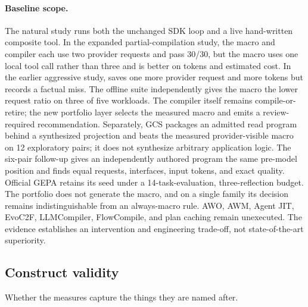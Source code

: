 \paragraph{Baseline scope.}
The natural study runs both the unchanged SDK loop and a live hand-written composite tool.
In the expanded partial-compilation study, the macro and compiler each use two provider
requests and pass 30/30, but the macro uses one local tool call rather than three and is
better on tokens and estimated cost.  In the earlier aggressive study, \method saves one
more provider request and more tokens but records a factual miss.  The offline suite
independently gives the macro the lower request ratio on three of five workloads.  The
compiler itself remains compile-or-retire; the new portfolio layer selects the measured
macro and emits a review-required recommendation.  Separately, GCS packages an admitted
read program behind a synthesized projection and beats the measured provider-visible
macro on 12 exploratory pairs; it does not synthesize arbitrary application logic.  The
six-pair follow-up gives an independently authored program the same pre-model position and
finds equal requests, interfaces, input tokens, and exact quality.  Official GEPA retains
its seed under a 14-task-evaluation, three-reflection budget.  The portfolio does not
generate the macro, and on a single family its decision remains indistinguishable from an
always-macro rule.  AWO, AWM, Agent JIT, EvoC2F, LLMCompiler, FlowCompile, and plan caching
remain unexecuted.  The evidence establishes an intervention and engineering trade-off,
not state-of-the-art superiority.

\subsection{Construct validity}

Whether the measures capture the things they are named after.

